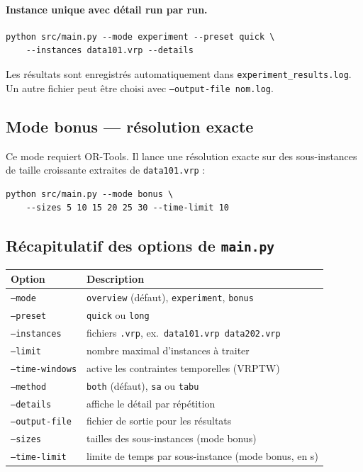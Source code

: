\documentclass[11pt,a4paper]{article}
\begin{document}
\paragraph{Instance unique avec détail run par run.}

\begin{lstlisting}
python src/main.py --mode experiment --preset quick \
    --instances data101.vrp --details
\end{lstlisting}

Les résultats sont enregistrés automatiquement dans \texttt{experiment\_results.log}. Un autre fichier peut être choisi avec \texttt{--output-file nom.log}.

\subsection{Mode bonus — résolution exacte}

Ce mode requiert OR-Tools. Il lance une résolution exacte sur des sous-instances de taille croissante extraites de \texttt{data101.vrp} :

\begin{lstlisting}
python src/main.py --mode bonus \
    --sizes 5 10 15 20 25 30 --time-limit 10
\end{lstlisting}

\subsection{Récapitulatif des options de \texttt{main.py}}

\begin{center}
\begin{tabular}{ll}
\toprule
Option & Description \\
\midrule
\texttt{--mode} & \texttt{overview} (défaut), \texttt{experiment}, \texttt{bonus} \\
\texttt{--preset} & \texttt{quick} ou \texttt{long} \\
\texttt{--instances} & fichiers \texttt{.vrp}, ex.\ \texttt{data101.vrp data202.vrp} \\
\texttt{--limit} & nombre maximal d'instances à traiter \\
\texttt{--time-windows} & active les contraintes temporelles (VRPTW) \\
\texttt{--method} & \texttt{both} (défaut), \texttt{sa} ou \texttt{tabu} \\
\texttt{--details} & affiche le détail par répétition \\
\texttt{--output-file} & fichier de sortie pour les résultats \\
\texttt{--sizes} & tailles des sous-instances (mode bonus) \\
\texttt{--time-limit} & limite de temps par sous-instance (mode bonus, en s) \\
\bottomrule
\end{tabular}
\end{center}
\end{document}
